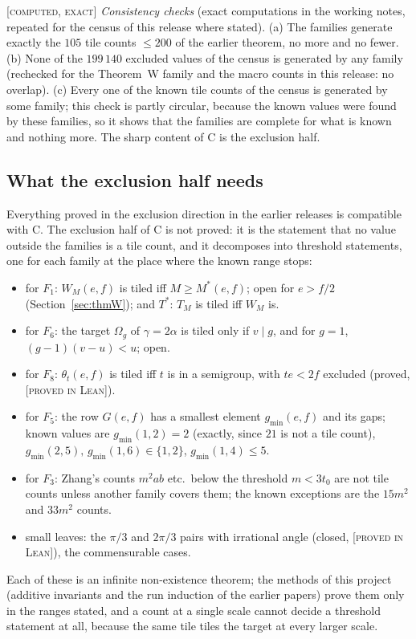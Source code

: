 \documentclass[11pt,reqno]{amsart}
\theoremstyle{plain}
\theoremstyle{definition}
\newcommand{\lab}[1]{\textup{[\textsc{#1}]}}
\newcommand{\PL}{\lab{proved in Lean}}
\newcommand{\CE}{\lab{computed, exact}}
\begin{document}
\medskip
\noindent\CE{} \emph{Consistency checks} (exact computations in the working notes, repeated for the census of this release where stated).
(a) The families generate exactly the $105$ tile counts $\le200$ of the earlier theorem, no more and no fewer.
(b) None of the $199\,140$ excluded values of the census is generated by any family (rechecked for the Theorem~W family and the macro counts in this release: no overlap).
(c) Every one of the known tile counts of the census is generated by some family; this check is partly circular, because the known values were found by these families, so it shows that the families are complete for what is known and nothing more.
The sharp content of C is the exclusion half.

\subsection{What the exclusion half needs}
Everything proved in the exclusion direction in the earlier releases is compatible with C. The exclusion half of C is not proved: it is the statement that no value outside the families is a tile count, and it decomposes into threshold statements, one for each family at the place where the known range stops:
\begin{itemize}
\item[$W^*$] for $F_1$: $W_M(e,f)$ is tiled iff $M\ge M^*(e,f)$; open for $e>f/2$ (Section~\ref{sec:thmW}); and $T^*$: $T_M$ is tiled iff $W_M$ is.
\item[$V,A'$] for $F_6$: the target $\Omega_g$ of $\gamma=2\alpha$ is tiled only if $v\mid g$, and for $g=1$, $(g-1)(v-u)<u$; open.
\item[$\Theta$] for $F_8$: $\theta_t(e,f)$ is tiled iff $t$ is in a semigroup, with $te<2f$ excluded (proved, \PL{}).
\item[$S_3$] for $F_5$: the row $G(e,f)$ has a smallest element $g_{\min}(e,f)$ and its gaps; known values are $g_{\min}(1,2)=2$ (exactly, since $21$ is not a tile count), $g_{\min}(2,5),\,g_{\min}(1,6)\in\{1,2\}$, $g_{\min}(1,4)\le5$.
\item[$Z$] for $F_3$: Zhang's counts $m^2a b$ etc.\ below the threshold $m<3t_0$ are not tile counts unless another family covers them; the known exceptions are the $15m^2$ and $33m^2$ counts.
\item small leaves: the $\pi/3$ and $2\pi/3$ pairs with irrational angle (closed, \PL{}), the commensurable cases.
\end{itemize}
Each of these is an infinite non-existence theorem; the methods of this project (additive invariants and the run induction of the earlier papers) prove them only in the ranges stated, and a count at a single scale cannot decide a threshold statement at all, because the same tile tiles the target at every larger scale.
\end{document}
